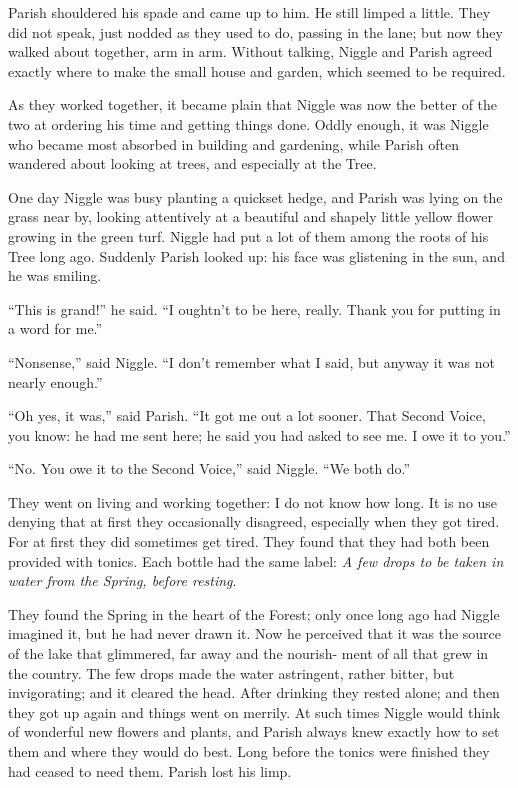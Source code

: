 \documentclass[english]{scrartcl}
\begin{document}
Parish shouldered his spade and came up to him. He still limped a little. They did not speak, just nodded as they used to do, passing in the lane; but now they walked about together, arm in arm. Without talking, Niggle and Parish agreed exactly where to make the small house and garden, which seemed to be required.

As they worked together, it became plain that Niggle was now the better of the two at ordering his time and getting things done. Oddly enough, it was Niggle who became most absorbed in building and gardening, while Parish often wandered about looking at trees, and especially at the Tree.

One day Niggle was busy planting a quickset hedge, and Parish was lying on the grass near by, looking attentively at a beautiful and shapely little yellow flower growing in the green turf. Niggle had put a lot of them among the roots of his Tree long ago. Suddenly Parish looked up: his face was glistening in the sun, and he was smiling.

“This is grand!” he said. “I oughtn’t to be here, really. Thank you for putting in a word for me.”

“Nonsense,” said Niggle. “I don’t remember what I said, but anyway it was not nearly enough.”

“Oh yes, it was,” said Parish. “It got me out a lot sooner. That Second Voice, you know: he had me sent here; he said you had asked to see me. I owe it to you.”

“No. You owe it to the Second Voice,” said Niggle. “We both do.”

They went on living and working together: I do not know how long. It is no use denying that at first they occasionally disagreed, especially when they got tired. For at first they did sometimes get tired. They found that they had both been provided with tonics. Each bottle had the same label: \emph{A few drops to be taken in water from the Spring, before resting}.

They found the Spring in the heart of the Forest; only once long ago had Niggle imagined it, but he had never drawn it. Now he perceived that it was the source of the lake that glimmered, far away and the nourish- ment of all that grew in the country. The few drops made the water astringent, rather bitter, but invigorating; and it cleared the head. After drinking they rested alone; and then they got up again and things went on merrily. At such times Niggle would think of wonderful new flowers and plants, and Parish always knew exactly how to set them and where they would do best. Long before the tonics were finished they had ceased to need them. Parish lost his limp.
\end{document}
